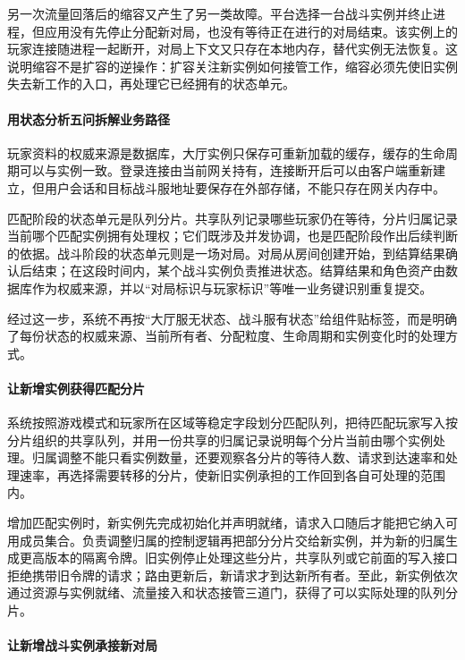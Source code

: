 另一次流量回落后的缩容又产生了另一类故障。平台选择一台战斗实例并终止进程，但应用没有先停止分配新对局，也没有等待正在进行的对局结束。该实例上的玩家连接随进程一起断开，对局上下文又只存在本地内存，替代实例无法恢复。这说明缩容不是扩容的逆操作：扩容关注新实例如何接管工作，缩容必须先使旧实例失去新工作的入口，再处理它已经拥有的状态单元。

\paragraph{用状态分析五问拆解业务路径}

玩家资料的权威来源是数据库，大厅实例只保存可重新加载的缓存，缓存的生命周期可以与实例一致。登录连接由当前网关持有，连接断开后可以由客户端重新建立，但用户会话和目标战斗服地址要保存在外部存储，不能只存在网关内存中。

匹配阶段的状态单元是队列分片。共享队列记录哪些玩家仍在等待，分片归属记录当前哪个匹配实例拥有处理权；它们既涉及并发协调，也是匹配阶段作出后续判断的依据。战斗阶段的状态单元则是一场对局。对局从房间创建开始，到结算结果确认后结束；在这段时间内，某个战斗实例负责推进状态。结算结果和角色资产由数据库作为权威来源，并以“对局标识与玩家标识”等唯一业务键识别重复提交。

经过这一步，系统不再按“大厅服无状态、战斗服有状态”给组件贴标签，而是明确了每份状态的权威来源、当前所有者、分配粒度、生命周期和实例变化时的处理方式。

\paragraph{让新增实例获得匹配分片}

系统按照游戏模式和玩家所在区域等稳定字段划分匹配队列，把待匹配玩家写入按分片组织的共享队列，并用一份共享的归属记录说明每个分片当前由哪个实例处理。归属调整不能只看实例数量，还要观察各分片的等待人数、请求到达速率和处理速率，再选择需要转移的分片，使新旧实例承担的工作回到各自可处理的范围内。

增加匹配实例时，新实例先完成初始化并声明就绪，请求入口随后才能把它纳入可用成员集合。负责调整归属的控制逻辑再把部分分片交给新实例，并为新的归属生成更高版本的隔离令牌。旧实例停止处理这些分片，共享队列或它前面的写入接口拒绝携带旧令牌的请求；路由更新后，新请求才到达新所有者。至此，新实例依次通过资源与实例就绪、流量接入和状态接管三道门，获得了可以实际处理的队列分片。

\paragraph{让新增战斗实例承接新对局}

